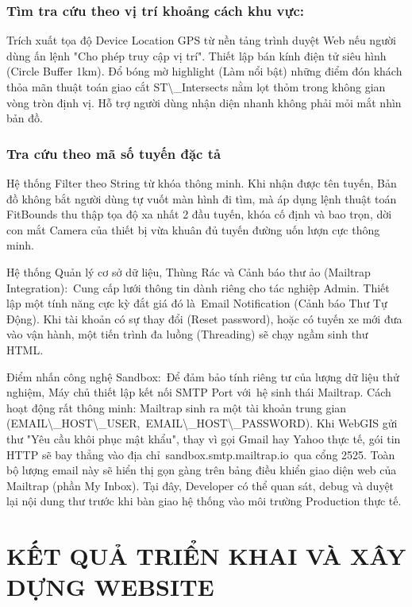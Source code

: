 \documentclass[13pt,a4paper]{report}
\begin{document}
\subsection{Tìm tra cứu theo vị trí khoảng cách khu vực:}

Trích xuất tọa độ Device Location GPS từ nền tảng trình duyệt Web nếu người dùng ấn lệnh "Cho phép truy cập vị trí". Thiết lập bán kính điện tử siêu hình (Circle Buffer 1km). Đổ bóng mờ highlight (Làm nổi bật) những điểm đón khách thỏa mãn thuật toán giao cắt ST\textbackslash{}_Intersects nằm lọt thỏm trong không gian vòng tròn định vị. Hỗ trợ người dùng nhận diện nhanh không phải mỏi mắt nhìn bản đồ.

\subsection{Tra cứu theo mã số tuyến đặc tả}

Hệ thống Filter theo String từ khóa thông minh. Khi nhận được tên tuyến, Bản đồ không bắt người dùng tự vuốt màn hình đi tìm, mà áp dụng lệnh thuật toán FitBounds thu thập tọa độ xa nhất 2 đầu tuyến, khóa cố định và bao trọn, dời con mắt Camera của thiết bị vừa khuân đủ tuyến đường uốn lượn cực thông minh.

Hệ thống Quản lý cơ sở dữ liệu, Thùng Rác và Cảnh báo thư ảo (Mailtrap Integration): Cung cấp lưới thông tin dành riêng cho tác nghiệp Admin. Thiết lập một tính năng cực kỳ đắt giá đó là Email Notification (Cảnh báo Thư Tự Động). Khi tài khoản có sự thay đổi (Reset password), hoặc có tuyến xe mới đưa vào vận hành, một tiến trình đa luồng (Threading) sẽ chạy ngầm sinh thư HTML.

Điểm nhấn công nghệ Sandbox: Để đảm bảo tính riêng tư của lượng dữ liệu thử nghiệm, Máy chủ thiết lập kết nối SMTP Port với hệ sinh thái Mailtrap. Cách hoạt động rất thông minh: Mailtrap sinh ra một tài khoản trung gian (EMAIL\textbackslash{}_HOST\textbackslash{}_USER, EMAIL\textbackslash{}_HOST\textbackslash{}_PASSWORD). Khi WebGIS gửi thư "Yêu cầu khôi phục mật khẩu", thay vì gọi Gmail hay Yahoo thực tế, gói tin HTTP sẽ bay thẳng vào địa chỉ sandbox.smtp.mailtrap.io qua cổng 2525. Toàn bộ lượng email này sẽ hiển thị gọn gàng trên bảng điều khiển giao diện web của Mailtrap (phần My Inbox). Tại đây, Developer có thể quan sát, debug và duyệt lại nội dung thư trước khi bàn giao hệ thống vào môi trường Production thực tế.

\chapter{KẾT QUẢ TRIỂN KHAI VÀ XÂY DỰNG WEBSITE}
\end{document}
